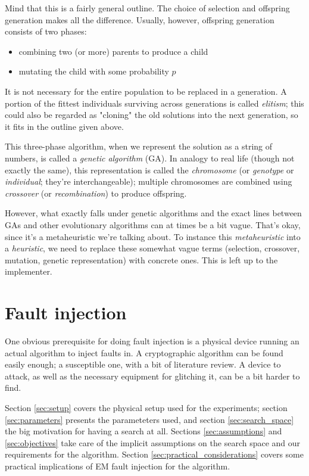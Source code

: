 \documentclass[times, utf8, diplomski]{fer}
\begin{document}
Mind that this is a fairly general outline.
The choice of selection and offspring generation makes all the difference.
Usually, however, offspring generation consists of two phases:
\begin{itemize}
    \item combining two (or more) parents to produce a child
    \item mutating the child with some probability $p$
\end{itemize}
It is not necessary for the entire population to be replaced in a generation.
A portion of the fittest individuals surviving across generations is called
\emph{elitism}; this could also be regarded as "cloning" the old solutions into
the next generation, so it fits in the outline given above.

This three-phase algorithm, when we represent the solution as a string of numbers,
is called a \emph{genetic algorithm} (GA).
In analogy to real life (though not exactly the same), this representation is
called the \emph{chromosome} (or \emph{genotype} or \emph{individual}; they're
interchangeable); multiple chromosomes are combined using \emph{crossover}
(or \emph{recombination}) to produce offspring.

However, what exactly falls under genetic algorithms and the exact lines between
GAs and other evolutionary algorithms can at times be a bit vague. That's okay,
since it's a metaheuristic we're talking about.
To instance this \emph{metaheuristic} into a \emph{heuristic}, we need to replace
these somewhat vague terms (selection, crossover, mutation, genetic representation)
with concrete ones. This is left up to the implementer.



\chapter{Fault injection}\label{ch:fault_injection}
One obvious prerequisite for doing fault injection is a physical device running
an actual algorithm to inject faults in. A cryptographic algorithm can be found
easily enough; a susceptible one, with a bit of literature review. A device to
attack, as well as the necessary equipment for glitching it, can be a bit harder
to find.

Section \ref{sec:setup} covers the physical setup used for the experiments;
section \ref{sec:parameters} presents the parameteters used, and section
\ref{sec:search_space} the big motivation for having a search at all.
Sections \ref{sec:assumptions} and \ref{sec:objectives} take care of
the implicit assumptions on the search space and our requirements for
the algorithm. Section \ref{sec:practical_considerations} covers some
practical implications of EM fault injection for the algorithm.
\end{document}

